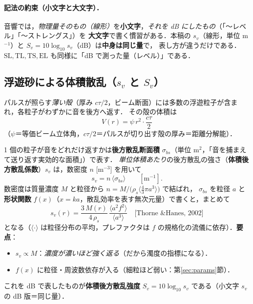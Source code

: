 \documentclass[11pt]{ltjsarticle}
\begin{document}
\paragraph{記法の約束（小文字と大文字）．}
音響では，\emph{物理量そのもの（線形）}を\textbf{小文字}，\emph{それを dB にしたもの}（「〜レベル」「〜ストレングス」）を
\textbf{大文字}で書く慣習がある．本稿の $s_v$（線形，単位 m$^{-1}$）と $S_v=10\log_{10}s_v$（dB）は\textbf{中身は同じ量}で，
表し方が違うだけである．$\mathrm{SL},\mathrm{TL},\mathrm{TS},\mathrm{EL}$ も同様に「dB で測った量（レベル）」である．

\subsection{浮遊砂による体積散乱（$s_v$ と $S_v$）}
パルスが照らす\emph{薄い殻}（厚み $c\tau/2$，ビーム断面）には多数の浮遊粒子が含まれ，各粒子がわずかに音を後方へ返す．
その殻の体積は
\begin{equation}
V(r)=\psi\,r^2\cdot\frac{c\tau}{2}
\end{equation}
（$\psi$＝等価ビーム立体角，$c\tau/2$＝パルスが切り出す殻の厚み＝距離分解能）．

1 個の粒子が音をどれだけ返すかは\textbf{後方散乱断面積} $\sigma_{bs}$（単位 m$^2$，「音を捕まえて送り返す実効的な面積」）で表す．
\emph{単位体積あたり}の後方散乱の強さ（\textbf{体積後方散乱係数}）$s_v$ は，数密度 $n$ [m$^{-3}$] を用いて
\begin{equation}
s_v=n\,\langle\sigma_{bs}\rangle\qquad[\mathrm{m^{-1}}].
\end{equation}
数密度は質量濃度 $M$ と粒径から $n=M\big/\big(\rho_s\langle\tfrac{4}{3}\pi a^3\rangle\big)$ で結ばれ，
$\sigma_{bs}$ を粒径 $a$ と\textbf{形状関数} $f(x)$（$x=ka$，散乱効率を表す無次元量）で書くと，まとめて
\begin{equation}
s_v(r)=\frac{3\,M(r)}{4\,\rho_s}\,\frac{\langle a^2 f^2\rangle}{\langle a^3\rangle}
\quad\text{[Thorne \& Hanes, 2002]}
\label{eq:sv}
\end{equation}
となる（$\langle\cdot\rangle$ は粒径分布の平均，プレファクタは $f$ の規格化の流儀に依存）．\textbf{要点}：
\begin{itemize}[nosep]
  \item $s_v\propto M$：\emph{濃度が濃いほど強く返る}（だから濁度の指標になる）．
  \item $f(x)$ に粒径・周波数依存が入る（細粒ほど弱い：第\ref{sec:params}節）．
\end{itemize}
これを dB で表したものが\textbf{体積後方散乱強度} $S_v=10\log_{10}s_v$ である（小文字 $s_v$ の dB 版＝同じ量）．
\end{document}
